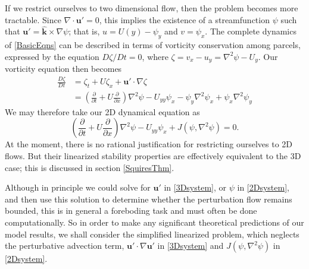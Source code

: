 \documentclass[letterpaper, 11pt, onecolumn]{article}
\newcommand{\pdiff}[2]{\frac{\partial #1}{\partial #2}}
\newcommand{\jcbn}[2]{J\left(#1, #2 \right)}
\begin{document}
If we restrict ourselves to two dimensional flow, then the problem becomes more tractable. Since $\nabla \cdot \bm{u}' = 0$, this implies the existence of a streamfunction $\psi$ such that $\bm{u}' = \widehat{\bm{k}} \times \nabla \psi$; that is, $u = U(y) - \psi_y$ and $v = \psi_x$. The complete dynamics of \eqref{BasicEqns} can be described in terms of vorticity conservation among parcels, expressed by the equation $D\zeta / Dt = 0$, where $\zeta = v_x - u_y = \nabla^2 \psi - U_y$. Our vorticity equation then becomes
\begin{equation*}
\begin{split}
\frac{D\zeta}{Dt} &= \zeta_t + U \zeta_x + \bm{u}' \cdot \nabla \zeta \\
&= \left(\pdiff{}{t} + U \pdiff{}{x} \right) \nabla^2 \psi - U_{yy} \psi_x - \psi_y \nabla^2 \psi_x + \psi_x \nabla^2 \psi_y
\end{split}
\end{equation*}
We may therefore take our 2D dynamical equation as
\begin{equation}\label{2Dsystem}
\left(\pdiff{}{t} + U \pdiff{}{x} \right) \nabla^2 \psi - U_{yy} \psi_x + \jcbn{\psi}{\nabla^2 \psi} = 0.
\end{equation}
At the moment, there is no rational justification for restricting ourselves to 2D flows. But their linearized stability properties are effectively equivalent to the 3D case; this is discussed in section \ref{SquiresThm}.

Although in principle we could solve for $\bm{u}'$ in \eqref{3Dsystem}, or $\psi$ in \eqref{2Dsystem}, and then use this solution to determine whether the perturbation flow remains bounded, this is in general a foreboding task and must often be done computationally. So in order to make any significant theoretical predictions of our model results, we shall consider the simplified linearized problem, which neglects the perturbative advection term, $\bm{u}' \cdot \nabla \bm{u}'$ in \eqref{3Dsystem} and $\jcbn{\psi}{\nabla^2 \psi}$ in \eqref{2Dsystem}.
\end{document}
